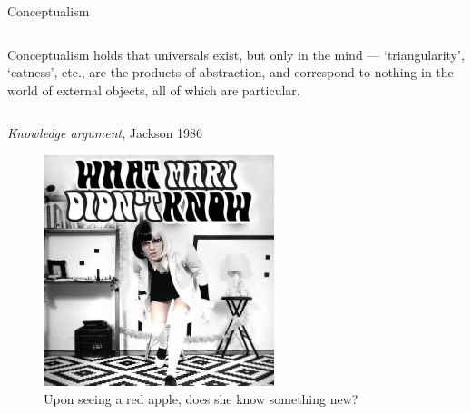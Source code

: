 \documentclass[xcolor=dvipsnames]{beamer}
\begin{document}
\begin{frame}{Conceptualism}
  \begin{columns}
Conceptualism holds that universals exist, but only in the mind --- `triangularity', `catness', etc., are the products of abstraction, and correspond to nothing in the world of external objects, all of which are particular.
  \end{columns}
\end{frame}


\begin{frame}{\emph{Knowledge argument}, Jackson 1986}
  \begin{figure}
    \centering
    \includegraphics[width=0.6\textwidth]{mary-song}
    \caption {Upon seeing a red apple, does she know something new?}
  \end{figure}
\end{frame}
\end{document}

